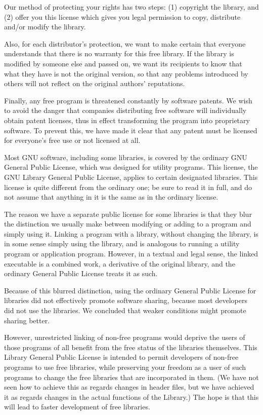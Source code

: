 \documentclass[twoside]{tceusermanual}
\begin{document}
Our method of protecting your rights has two steps: (1)
copyright the library, and (2) offer you this license which
gives you legal permission to copy, distribute and/or modify the
library.

Also, for each distributor's protection, we want to make certain
that everyone understands that there is no warranty for this
free library.  If the library is modified by someone else and
passed on, we want its recipients to know that what they have is
not the original version, so that any problems introduced by
others will not reflect on the original authors' reputations.
 
Finally, any free program is threatened constantly by software
patents.  We wish to avoid the danger that companies
distributing free software will individually obtain patent
licenses, thus in effect transforming the program into
proprietary software.  To prevent this, we have made it clear
that any patent must be licensed for everyone's free use or not
licensed at all.

Most GNU software, including some libraries, is covered by the
ordinary GNU General Public License, which was designed for
utility programs.  This license, the GNU Library General Public
License, applies to certain designated libraries.  This license
is quite different from the ordinary one; be sure to read it in
full, and do not assume that anything in it is the same as in the
ordinary license.

The reason we have a separate public license for some libraries
is that they blur the distinction we usually make between
modifying or adding to a program and simply using it.  Linking a
program with a library, without changing the library, is in some
sense simply using the library, and is analogous to running a
utility program or application program.  However, in a textual
and legal sense, the linked executable is a combined work, a
derivative of the original library, and the ordinary General
Public License treats it as such.

Because of this blurred distinction, using the ordinary General
Public License for libraries did not effectively promote
software sharing, because most developers did not use the
libraries.  We concluded that weaker conditions might promote
sharing better.

However, unrestricted linking of non-free programs would deprive
the users of those programs of all benefit from the free status
of the libraries themselves.  This Library General Public
License is intended to permit developers of non-free programs to
use free libraries, while preserving your freedom as a user of
such programs to change the free libraries that are incorporated
in them.  (We have not seen how to achieve this as regards
changes in header files, but we have achieved it as regards
changes in the actual functions of the Library.)  The hope is
that this will lead to faster development of free libraries.
\end{document}
